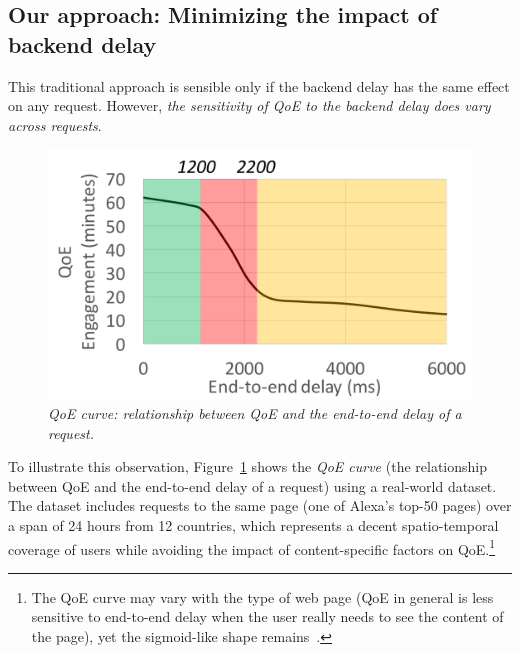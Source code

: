 \subsection{Our approach: Minimizing the impact of backend delay}

This traditional approach is sensible only if the backend delay has the same effect on any request.
However, {\em the sensitivity of QoE to the backend delay does vary across requests}. %

\begin{figure}
	\centering
	\vspace{-0.5cm}
	\includegraphics[width=1.0\textwidth]{figs/qoe-curve.pdf}
	\caption{\em QoE curve: relationship between QoE and the end-to-end delay of a request.}
	\label{fig:qoe-curve}
\end{figure}
To illustrate this observation, Figure~\ref{fig:qoe-curve} shows the {\em QoE curve} (\ie the relationship between QoE and the end-to-end delay of a request) using  a real-world dataset.
The dataset includes requests to the same page (one of Alexa's top-50 pages) over a span of 24 hours from 12 countries, which represents a decent spatio-temporal coverage of users while avoiding the impact of content-specific factors on QoE.\footnote{The QoE curve may vary with the type of web page (\eg QoE in general is less sensitive to end-to-end delay when the user really needs to see the content of the page), yet the sigmoid-like shape remains~\cite{akamai-report}.} 
